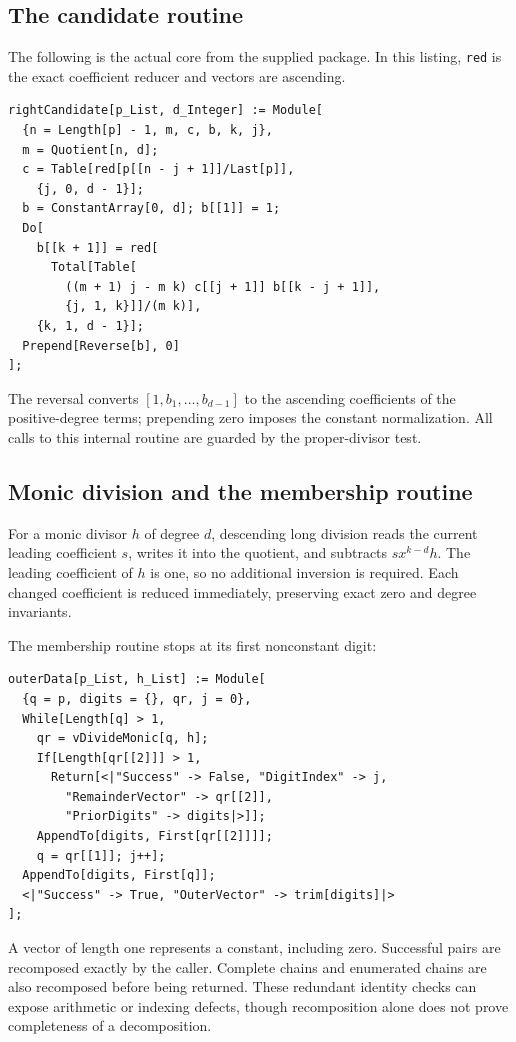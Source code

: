 \documentclass[11pt,letterpaper]{article}
\theoremstyle{definition}
\theoremstyle{remark}
\newcommand{\wt}[1]{\texttt{#1}}
\begin{document}
\subsection{The candidate routine}
The following is the actual core from the supplied package. In this
listing, \wt{red} is the exact coefficient reducer and vectors are
ascending.
\begin{lstlisting}
rightCandidate[p_List, d_Integer] := Module[
  {n = Length[p] - 1, m, c, b, k, j},
  m = Quotient[n, d];
  c = Table[red[p[[n - j + 1]]/Last[p]],
    {j, 0, d - 1}];
  b = ConstantArray[0, d]; b[[1]] = 1;
  Do[
    b[[k + 1]] = red[
      Total[Table[
        ((m + 1) j - m k) c[[j + 1]] b[[k - j + 1]],
        {j, 1, k}]]/(m k)],
    {k, 1, d - 1}];
  Prepend[Reverse[b], 0]
];
\end{lstlisting}
The reversal converts $[1,b_1,\ldots,b_{d-1}]$ to the ascending
coefficients of the positive-degree terms; prepending zero imposes the
constant normalization. All calls to this internal routine are guarded
by the proper-divisor test.

\subsection{Monic division and the membership routine}
For a monic divisor $h$ of degree $d$, descending long division reads
the current leading coefficient $s$, writes it into the quotient, and
subtracts $s x^{k-d}h$. The leading coefficient of $h$ is one, so no
additional inversion is required. Each changed coefficient is reduced
immediately, preserving exact zero and degree invariants.

The membership routine stops at its first nonconstant digit:
\begin{lstlisting}
outerData[p_List, h_List] := Module[
  {q = p, digits = {}, qr, j = 0},
  While[Length[q] > 1,
    qr = vDivideMonic[q, h];
    If[Length[qr[[2]]] > 1,
      Return[<|"Success" -> False, "DigitIndex" -> j,
        "RemainderVector" -> qr[[2]],
        "PriorDigits" -> digits|>]];
    AppendTo[digits, First[qr[[2]]]];
    q = qr[[1]]; j++];
  AppendTo[digits, First[q]];
  <|"Success" -> True, "OuterVector" -> trim[digits]|>
];
\end{lstlisting}
A vector of length one represents a constant, including zero. Successful
pairs are recomposed exactly by the caller. Complete chains and enumerated
chains are also recomposed before being returned. These redundant identity
checks can expose arithmetic or indexing defects, though recomposition
alone does not prove completeness of a decomposition.
\end{document}

